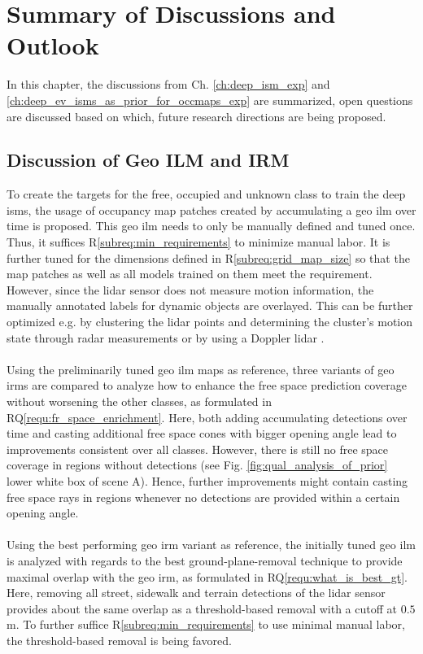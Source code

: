 \chapter{Summary of Discussions and Outlook}
\label{ch:discussion_of_req_n_rq}
In this chapter, the discussions from Ch. \ref{ch:deep_ism_exp} and \ref{ch:deep_ev_isms_as_prior_for_occmaps_exp} are summarized, open questions are discussed based on which, future research directions are being proposed.
%
\section{Discussion of Geo ILM and IRM}
\label{sec:disc_of_geo_ilm_n_irm}
To create the targets for the free, occupied and unknown class to train the deep \gls{ism}s, the usage of occupancy map patches created by accumulating a geo \gls{ilm} over time is proposed. This geo \gls{ilm} needs to only be manually defined and tuned once. Thus, it suffices R\ref{subreq:min_requirements} to minimize manual labor. It is further tuned for the dimensions defined in R\ref{subreq:grid_map_size} so that the map patches as well as all models trained on them meet the requirement. However, since the lidar sensor does not measure motion information, the manually annotated labels for dynamic objects are overlayed. This can be further optimized e.g. by clustering the lidar points and determining the cluster's motion state through radar measurements or by using a Doppler lidar \cite{ma2019moving}.
\\\\
Using the preliminarily tuned geo \gls{ilm} maps as reference, three variants of geo \gls{irm}s are compared to analyze how to enhance the free space prediction coverage without worsening the other classes, as formulated in RQ\ref{requ:fr_space_enrichment}. Here, both adding accumulating detections over time and casting additional free space cones with bigger opening angle lead to improvements consistent over all classes. However, there is still no free space coverage in regions without detections (see Fig. \ref{fig:qual_analysis_of_prior} lower white box of scene A). Hence, further improvements might contain casting free space rays in regions whenever no detections are provided within a certain opening angle.
\\\\
Using the best performing geo \gls{irm} variant as reference, the initially tuned geo \gls{ilm} is analyzed with regards to the best ground-plane-removal technique to provide maximal overlap with the geo \gls{irm}, as formulated in RQ\ref{requ:what_is_best_gt}. Here, removing all street, sidewalk and terrain detections of the lidar sensor provides about the same overlap as a threshold-based removal with a cutoff at $0.5$ m. To further suffice R\ref{subreq:min_requirements} to use minimal manual labor, the threshold-based removal is being favored.
%
